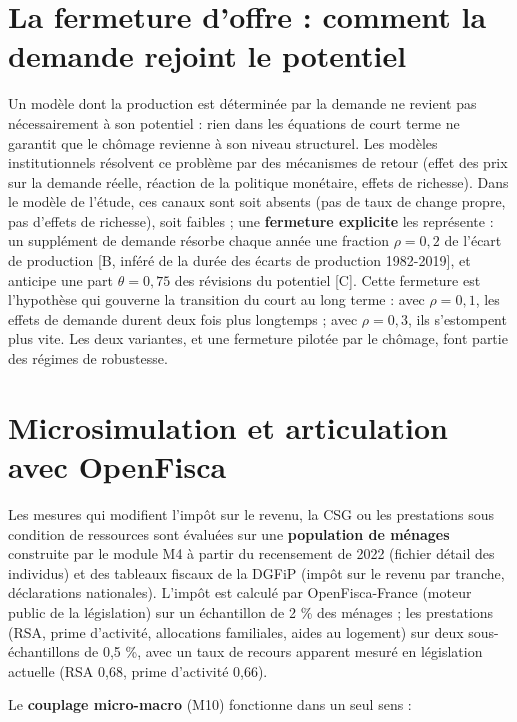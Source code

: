 \documentclass[
  11pt,
  11pt,
  a4paper,
  openany]{book}
\begin{document}
\hypertarget{sec:fermeture}{%
\section{La fermeture d'offre : comment la demande rejoint le
potentiel}\label{sec:fermeture}}

Un modèle dont la production est déterminée par la demande ne revient
pas nécessairement à son potentiel : rien dans les équations de court
terme ne garantit que le chômage revienne à son niveau structurel. Les
modèles institutionnels résolvent ce problème par des mécanismes de
retour (effet des prix sur la demande réelle, réaction de la politique
monétaire, effets de richesse). Dans le modèle de l'étude, ces canaux
sont soit absents (pas de taux de change propre, pas d'effets de
richesse), soit faibles ; une \textbf{fermeture explicite} les
représente : un supplément de demande résorbe chaque année une fraction
\(\rho = 0{,}2\) de l'écart de production {[}B, inféré de la durée des
écarts de production 1982-2019{]}, et anticipe une part
\(\theta = 0{,}75\) des révisions du potentiel {[}C{]}. Cette fermeture
est l'hypothèse qui gouverne la transition du court au long terme : avec
\(\rho = 0{,}1\), les effets de demande durent deux fois plus longtemps
; avec \(\rho = 0{,}3\), ils s'estompent plus vite. Les deux variantes,
et une fermeture pilotée par le chômage, font partie des régimes de
robustesse.

\hypertarget{sec:micro}{%
\section{Microsimulation et articulation avec
OpenFisca}\label{sec:micro}}

Les mesures qui modifient l'impôt sur le revenu, la CSG ou les
prestations sous condition de ressources sont évaluées sur une
\textbf{population de ménages} construite par le module M4 à partir du
recensement de 2022 (fichier détail des individus) et des tableaux
fiscaux de la DGFiP (impôt sur le revenu par tranche, déclarations
nationales). L'impôt est calculé par OpenFisca-France (moteur public de
la législation) sur un échantillon de 2 \% des ménages ; les prestations
(RSA, prime d'activité, allocations familiales, aides au logement) sur
deux sous-échantillons de 0,5 \%, avec un taux de recours apparent
mesuré en législation actuelle (RSA 0,68, prime d'activité 0,66).

Le \textbf{couplage micro-macro} (M10) fonctionne dans un seul sens :
\end{document}
